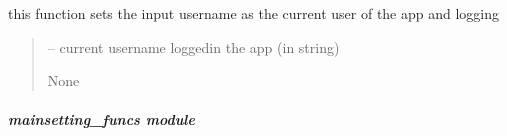 \documentclass[letterpaper,10pt,english]{sphinxmanual}
\begin{document}
\begin{savenotes}
\begin{fulllineitems}
\begin{savenotes}\begin{fulllineitems}
\label{\detokenize{setting/backend/logging_funcs:oxin.backend.logging_funcs.app_logger.set_current_user}}
\pysigstartsignatures
{}
\pysigstopsignatures
\sphinxAtStartPar
this function sets the input username as the current user of the app and logging
\begin{quote}\begin{description}
\sphinxAtStartPar
{} – current username logged\sphinxhyphen{}in the app (in string)

\sphinxAtStartPar
None

\end{description}\end{quote}

\end{fulllineitems}\end{savenotes}


\end{fulllineitems}\end{savenotes}


\sphinxstepscope


\subparagraph{mainsetting\_funcs module}
\label{\detokenize{setting/backend/mainsetting_funcs:module-oxin.backend.mainsetting_funcs}}\label{\detokenize{setting/backend/mainsetting_funcs:mainsetting-funcs-module}}\label{\detokenize{setting/backend/mainsetting_funcs::doc}}
\end{document}
